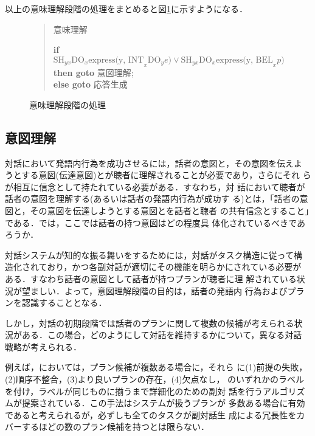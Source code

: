 以上の意味理解段階の処理をまとめると図\ref{step1}に示すようになる．

\begin{figure}[htbp]
\begin{quote}
\noindent
{\dg 意味理解}

\noindent
{\bf if} $\mbox{SH}_{yx}\mbox{DO}_x \mbox{express(y, INT}_x
\mbox{DO}_y e)
\lor \mbox{SH}_{yx}\mbox{DO}_x \mbox{express(y, BEL}_x p)$\\
{\bf then goto} 意図理解;\\
{\bf else goto} 応答生成
\end{quote}

\caption{意味理解段階の処理}
\label{step1}
\end{figure}

\vspace{-3mm}
\subsection{意図理解}

対話において発語内行為を成功させるには，話者の意図と，その意図を伝えよ
うとする意図(伝達意図)とが聴者に理解されることが必要であり，さらにそれ
らが相互に信念として持たれている必要がある\cite{allen95}．すなわち，対
話において聴者が話者の意図を理解する(あるいは話者の発語内行為が成功す
る)とは，「話者の意図と，その意図を伝達しようとする意図とを話者と聴者
の共有信念とすること」である．では，ここでは話者の持つ意図はどの程度具
体化されているべきであろうか．

対話システムが知的な振る舞いをするためには，対話がタスク構造に従って構
造化されており，かつ各副対話が適切にその機能を明らかにされている必要が
ある\cite{grosz86}．すなわち話者の意図として話者が持つプランが聴者に理
解されている状況が望ましい．よって，意図理解段階の目的は，話者の発語内
行為およびプランを認識することとなる．

しかし，対話の初期段階では話者のプランに関して複数の候補が考えられる状
況がある．この場合，どのようにして対話を維持するかについて，異なる対話
戦略が考えられる．

例えば，\cite{vanBeek93}においては，プラン候補が複数ある場合に，それら
に(1)前提の失敗，(2)順序不整合，(3)より良いプランの存在，(4)欠点なし，
のいずれかのラベルを付け，ラベルが同じものに揃うまで詳細化のための副対
話を行うアルゴリズムが提案されている．この手法はシステムが扱うプランが
多数ある場合に有効であると考えられるが，必ずしも全てのタスクが副対話生
成による冗長性をカバーするほどの数のプラン候補を持つとは限らない．


